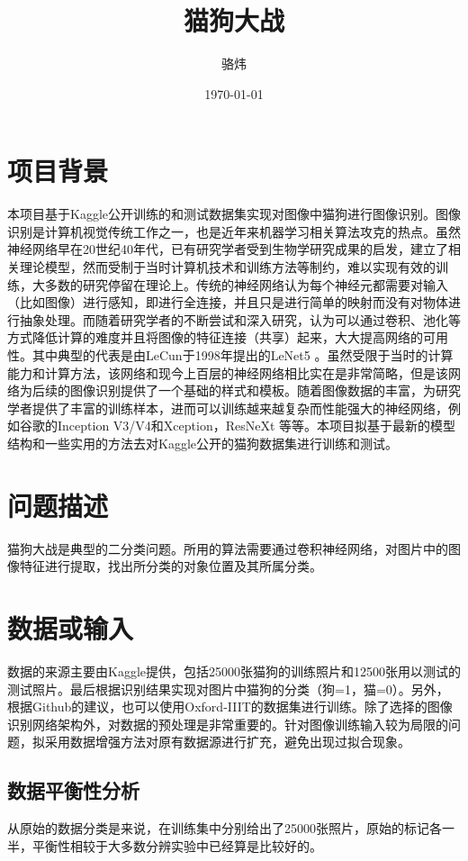 \documentclass[a4paper,11pt]{article}
\author{骆炜}
\date{\today}
\title{猫狗大战}
\begin{document}
\maketitle
\tableofcontents


\section{项目背景}
\label{sec:org9e456b5}
本项目基于Kaggle公开训练的和测试数据集实现对图像中猫狗进行图像识别。图像识别是计算机视觉传统工作之一，也是近年来机器学习相关算法攻克的热点。虽然神经网络早在20世纪40年代，已有研究学者受到生物学研究成果的启发，建立了相关理论模型，然而受制于当时计算机技术和训练方法等制约，难以实现有效的训练，大多数的研究停留在理论上。传统的神经网络认为每个神经元都需要对输入（比如图像）进行感知，即进行全连接，并且只是进行简单的映射而没有对物体进行抽象处理。而随着研究学者的不断尝试和深入研究，认为可以通过卷积、池化等方式降低计算的难度并且将图像的特征连接（共享）起来，大大提高网络的可用性。其中典型的代表是由LeCun于1998年提出的LeNet5 \cite{KrizhevskySutskeverHinton2017} 。虽然受限于当时的计算能力和计算方法，该网络和现今上百层的神经网络相比实在是非常简略，但是该网络为后续的图像识别提供了一个基础的样式和模板。随着图像数据的丰富，为研究学者提供了丰富的训练样本，进而可以训练越来越复杂而性能强大的神经网络，例如谷歌的Inception V3/V4和Xception，ResNeXt \cite{XieGirshickDollarTuHe2017} 等等。本项目拟基于最新的模型结构和一些实用的方法去对Kaggle公开的猫狗数据集进行训练和测试。
\section{问题描述}
\label{sec:org6f63352}
猫狗大战是典型的二分类问题。所用的算法需要通过卷积神经网络，对图片中的图像特征进行提取，找出所分类的对象位置及其所属分类。
\section{数据或输入}
\label{sec:org9cf5769}
数据的来源主要由Kaggle提供，包括25000张猫狗的训练照片和12500张用以测试的测试照片。最后根据识别结果实现对图片中猫狗的分类（狗=1，猫=0）。另外，根据Github的建议，也可以使用Oxford-IIIT的数据集进行训练。除了选择的图像识别网络架构外，对数据的预处理是非常重要的。针对图像训练输入较为局限的问题，拟采用数据增强方法对原有数据源进行扩充，避免出现过拟合现象。

\subsection{数据平衡性分析}
\label{sec:orgd80bbcc}
从原始的数据分类是来说，在训练集中分别给出了25000张照片，原始的标记各一半，平衡性相较于大多数分辨实验中已经算是比较好的。
\end{document}
